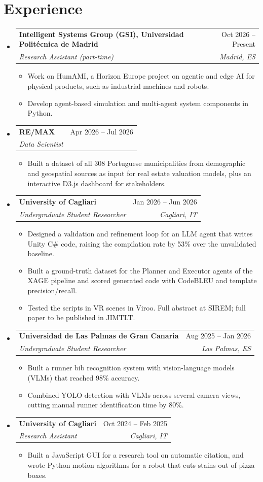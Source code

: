 \documentclass[a4paper,11pt]{article}
\makeatletter
\newcommand{\resumeItem}[1]{\item\small{{#1 \vspace{-2pt}}}}
\newcommand{\resumeSubheading}[4]{
  \vspace{-2pt}\item
    \begin{tabular*}{0.97\textwidth}[t]{l@{\extracolsep{\fill}}r}
      \textbf{#1} & #2 \\
      \textit{\small#3} & \textit{\small #4} \\
    \end{tabular*}\vspace{-7pt}
}
\newcommand{\resumeSubHeadingListStart}{\begin{itemize}[leftmargin=0.15in, label={}, itemsep=0pt, topsep=1pt]}
\newcommand{\resumeSubHeadingListEnd}{\end{itemize}}
\newcommand{\resumeItemListStart}{\begin{itemize}[leftmargin=0.2in, topsep=1pt, itemsep=0pt, parsep=0pt]}
\newcommand{\resumeItemListEnd}{\end{itemize}\vspace{-4pt}}
\makeatother
\begin{document}
\section{Experience}
  \resumeSubHeadingListStart
    \resumeSubheading
      {Intelligent Systems Group (GSI), Universidad Polit\'ecnica de Madrid}{Oct 2026 -- Present}
      {Research Assistant (part-time)}{Madrid, ES}
      \resumeItemListStart
        \resumeItem{Work on HumAMI, a Horizon Europe project on agentic and edge AI for physical products, such as industrial machines and robots.}
        \resumeItem{Develop agent-based simulation and multi-agent system components in Python.}
      \resumeItemListEnd
    \resumeSubheading
      {RE/MAX}{Apr 2026 -- Jul 2026}
      {Data Scientist}{}
      \resumeItemListStart
        \resumeItem{Built a dataset of all 308 Portuguese municipalities from demographic and geospatial sources as input for real estate valuation models, plus an interactive D3.js dashboard for stakeholders.}
      \resumeItemListEnd
    \resumeSubheading
      {University of Cagliari}{Jan 2026 -- Jun 2026}
      {Undergraduate Student Researcher}{Cagliari, IT}
      \resumeItemListStart
        \resumeItem{Designed a validation and refinement loop for an LLM agent that writes Unity C\# code, raising the compilation rate by 53\% over the unvalidated baseline.}
        \resumeItem{Built a ground-truth dataset for the Planner and Executor agents of the XAGE pipeline and scored generated code with CodeBLEU and template precision/recall.}
        \resumeItem{Tested the scripts in VR scenes in Viroo. Full abstract at SIREM; full paper to be published in JIMTLT.}
      \resumeItemListEnd
    \resumeSubheading
      {Universidad de Las Palmas de Gran Canaria}{Aug 2025 -- Jan 2026}
      {Undergraduate Student Researcher}{Las Palmas, ES}
      \resumeItemListStart
        \resumeItem{Built a runner bib recognition system with vision-language models (VLMs) that reached 98\% accuracy.}
        \resumeItem{Combined YOLO detection with VLMs across several camera views, cutting manual runner identification time by 80\%.}
      \resumeItemListEnd
    \resumeSubheading
      {University of Cagliari}{Oct 2024 -- Feb 2025}
      {Research Assistant}{Cagliari, IT}
      \resumeItemListStart
        \resumeItem{Built a JavaScript GUI for a research tool on automatic citation, and wrote Python motion algorithms for a robot that cuts stains out of pizza boxes.}
      \resumeItemListEnd
  \resumeSubHeadingListEnd

\end{document}
